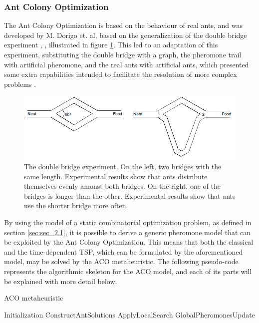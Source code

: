 \subsubsection{Ant Colony Optimization}
\label{sec:aco_lr}

The Ant Colony Optimization \cite{aco_original, aco_2, aco_overview_advances} is based on the behaviour of real ants, and was developed by M. Dorigo et. al, based on the generalization of the double bridge experiment \cite{double_bridge_1}, \cite{double_bridge_2}, illustrated in figure \ref{fig:double_bridge}. This led to an adaptation of this experiment, substituting the double bridge with a graph, the pheromone trail with artificial pheromone, and the real ants with artificial ants, which presented some extra capabilities intended to facilitate the resolution of more complex problems \cite{aco_overview_advances}.

\begin{figure}[htpb]
  \centering
  \includegraphics[width=\textwidth]{Figures/aco/double_bridge.png}
	\caption{The double bridge experiment. On the left, two bridges with the same length. Experimental results show that ants distribute themselves evenly amonst both bridges. 
On the right, one of the bridges is longer than the other. Experimental results show that ants use the shorter bridge more often.}
  \label{fig:double_bridge}  
\end{figure}

By using the model of a static combinatorial optimization problem, as defined in section \ref{sec:sec_2.1}, it is possible to derive a generic pheromone model that can be exploited by the Ant Colony Optimization. This means that both the classical and the time-dependent TSP, which can be formulated by the aforementioned model, may be solved by the ACO metaheuristic.
The following pseudo-code represents the algorithmic skeleton for the ACO model, and each of its parts will be explained with more detail below.


\makeatletter
\def\BState{\State\hskip-\ALG@thistlm}
\makeatother

\begin{algorithm}
\caption{ACO metaheuristic}\label{eq:aco_metacode}
\begin{algorithmic}[1]
\State Initialization
\State ConstructAntSolutions
\State ApplyLocalSearch 
\State GlobalPheromonesUpdate
\EndWhile
\EndProcedure
\end{algorithmic}
\end{algorithm}


